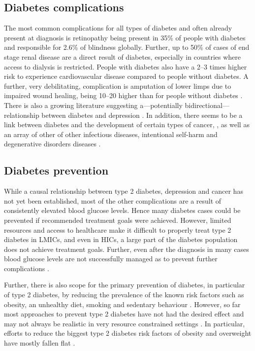 \subsection{Diabetes complications}

The most common complications for all types of diabetes and often already present at diagnosis is retinopathy being present in 35\% of people with diabetes and responsible for 2.6\% of blindness globally. Further, up to 50\% of cases of end stage renal disease are a direct result of diabetes, especially in countries where access to dialysis is restricted. People with diabetes also have a 2--3 times higher risk to experience cardiovascular disease compared to people without diabetes. A further, very debilitating, complication is amputation of lower limps due to impaired wound healing, being 10--20 higher than for people without diabetes \parencite{WorldHealthOrganization2016}. There is also a growing literature suggesting a---potentially bidirectional---relationship between diabetes and depression \parencite{VanDooren2013,Nouwen2010,Roy2012}. In addition, there seems to be a link between diabetes and the development of certain types of cancer, \parencite{Tsilidis2015,Nead2015}, as well as an array of other of other infectious diseases, intentional self-harm and degenerative disorders diseases \parencite{Seshasai2011}.


\subsection{Diabetes prevention}

While a causal relationship between type 2 diabetes, depression and cancer has not yet been established, most of the other complications are a result of consistently elevated blood glucose levels. Hence many diabetes cases could be prevented if recommended treatment goals were achieved. However, limited resources and access to healthcare make it difficult to properly treat type 2 diabetes in \acp{LMIC}, and even in \acp{HIC}, a large part of the diabetes population does not achieve treatment goals. Further, even after the diagnosis in many cases blood glucose levels are not successfully managed as to prevent further complications \parencite{Villalpando2010,DiabetesUK2012}. 

Further, there is also scope for the primary prevention of diabetes, in particular of type 2 diabetes, by reducing the prevalence of the known risk factors such as obesity, an unhealthy diet, smoking and sedentary behaviour \parencite{WorldHealthOrganization2016}. However, so far most approaches to prevent type 2 diabetes have not had the desired effect and may not always be realistic in very resource constrained settings \parencite{White2016}. In particular, efforts to reduce the biggest type 2 diabetes risk factors of obesity and overweight have mostly fallen flat \parencite{Roberto2015}.

